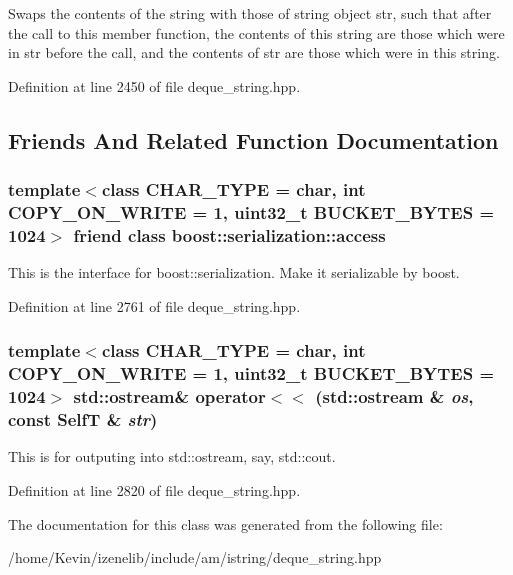 Swaps the contents of the string with those of string object str, such that after the call to this member function, the contents of this string are those which were in str before the call, and the contents of str are those which were in this string. 

Definition at line 2450 of file deque\_\-string.hpp.

\subsection{Friends And Related Function Documentation}
\hypertarget{classdeque__string_c98d07dd8f7b70e16ccb9a01abf56b9c}{
\subsubsection[{boost::serialization::access}]{\setlength{\rightskip}{0pt plus 5cm}template$<$class CHAR\_\-TYPE  = char, int COPY\_\-ON\_\-WRITE = 1, uint32\_\-t BUCKET\_\-BYTES = 1024$>$ friend class boost::serialization::access}}
\label{classdeque__string_c98d07dd8f7b70e16ccb9a01abf56b9c}


This is the interface for boost::serialization. Make it serializable by boost. 

Definition at line 2761 of file deque\_\-string.hpp.\hypertarget{classdeque__string_9f77d965eac7a717e9124196d686e094}{
\subsubsection[{operator$<$$<$}]{\setlength{\rightskip}{0pt plus 5cm}template$<$class CHAR\_\-TYPE  = char, int COPY\_\-ON\_\-WRITE = 1, uint32\_\-t BUCKET\_\-BYTES = 1024$>$ std::ostream\& operator$<$$<$ (std::ostream \& {\em os}, \/  const {\bf SelfT} \& {\em str})}}
\label{classdeque__string_9f77d965eac7a717e9124196d686e094}


This is for outputing into std::ostream, say, std::cout. 

Definition at line 2820 of file deque\_\-string.hpp.

The documentation for this class was generated from the following file:\begin{CompactItemize}
\item 
/home/Kevin/izenelib/include/am/istring/deque\_\-string.hpp\end{CompactItemize}
